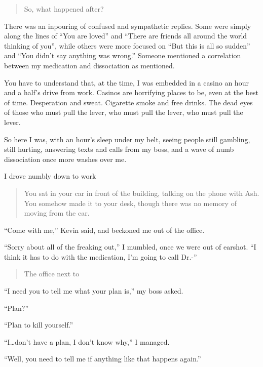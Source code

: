\begin{quote}
So, what happened after?
\end{quote}

There was an inpouring of confused and sympathetic replies. Some were simply along the lines of ``You are loved'' and ``There are friends all around the world thinking of you'', while others were more focused on ``But this is all so sudden'' and ``You didn't say anything was wrong.'' Someone mentioned a correlation between my medication and dissociation as mentioned.

You have to understand that, at the time, I was embedded in a casino an hour and a half's drive from work. Casinos are horrifying places to be, even at the best of time. Desperation and sweat. Cigarette smoke and free drinks. The dead eyes of those who must pull the lever, who must pull the lever, who must pull the lever.

So here I was, with an hour's sleep under my belt, seeing people still gambling, still hurting, answering texts and calls from my boss, and a wave of numb dissociation once more washes over me.

I drove numbly down to work

\begin{quote}
You sat in your car in front of the building, talking on the phone with Ash. You somehow made it to your desk, though there was no memory of moving from the car.
\end{quote}

``Come with me,'' Kevin said, and beckoned me out of the office.

``Sorry about all of the freaking out,'' I mumbled, once we were out of earshot. ``I think it has to do with the medication, I'm going to call Dr.-''

\begin{quote}
The office next to
\end{quote}

``I need you to tell me what your plan is,'' my boss asked.

``Plan?''

``Plan to kill yourself.''

``I\ldots{}don't have a plan, I don't know why,'' I managed.

``Well, you need to tell me if anything like that happens again.''
